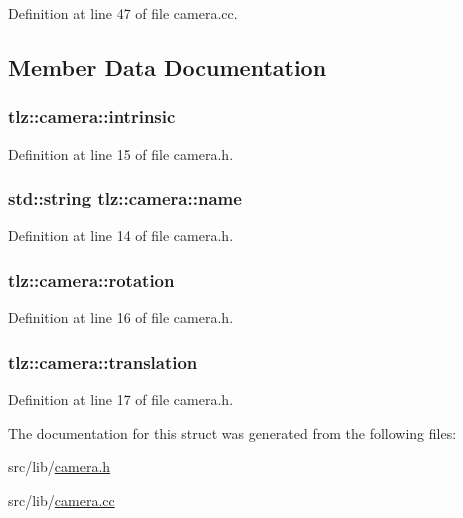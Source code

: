 Definition at line 47 of file camera.\+cc.



\subsection{Member Data Documentation}
\subsubsection[{\texorpdfstring{intrinsic}{intrinsic}}]{ tlz\+::camera\+::intrinsic}\hypertarget{structtlz_1_1camera_a55d65ad4264874a12d4383f9fca88f05}{}\label{structtlz_1_1camera_a55d65ad4264874a12d4383f9fca88f05}


Definition at line 15 of file camera.\+h.

\subsubsection[{\texorpdfstring{name}{name}}]{\setlength{\rightskip}{0pt plus 5cm}std\+::string tlz\+::camera\+::name}\hypertarget{structtlz_1_1camera_a0c5fcf5d5293da538fc73fa9a8351763}{}\label{structtlz_1_1camera_a0c5fcf5d5293da538fc73fa9a8351763}


Definition at line 14 of file camera.\+h.

\subsubsection[{\texorpdfstring{rotation}{rotation}}]{ tlz\+::camera\+::rotation}\hypertarget{structtlz_1_1camera_a537b8f4583f8fbefbb0e648c769495b3}{}\label{structtlz_1_1camera_a537b8f4583f8fbefbb0e648c769495b3}


Definition at line 16 of file camera.\+h.

\subsubsection[{\texorpdfstring{translation}{translation}}]{ tlz\+::camera\+::translation}\hypertarget{structtlz_1_1camera_aac48f184af54f06d867b60e30e3a710c}{}\label{structtlz_1_1camera_aac48f184af54f06d867b60e30e3a710c}


Definition at line 17 of file camera.\+h.



The documentation for this struct was generated from the following files\+:\begin{DoxyCompactItemize}
\item 
src/lib/\hyperlink{camera_8h}{camera.\+h}\item 
src/lib/\hyperlink{camera_8cc}{camera.\+cc}\end{DoxyCompactItemize}
